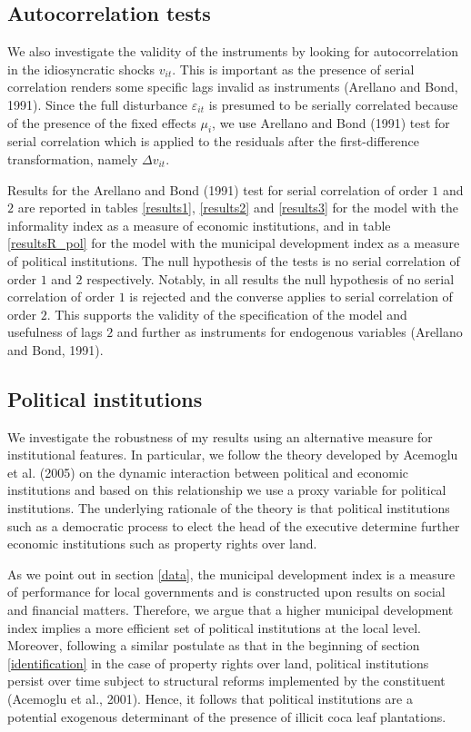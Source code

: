 \subsection{Autocorrelation tests}
\label{auto}

We also investigate the validity of the instruments by looking for  autocorrelation in the idiosyncratic shocks $v_{it}$. This is important as the presence of serial correlation renders some specific lags invalid as instruments (Arellano and Bond, 1991). Since the full disturbance $\varepsilon_{it}$ is presumed to be serially correlated because of the presence of the fixed effects $\mu_{i}$, we use Arellano and Bond (1991) test for serial correlation which is applied to the residuals after the first-difference transformation, namely $\Delta v_{it}$.

Results for the Arellano and Bond (1991) test for serial correlation of order $1$ and $2$ are reported in tables \ref{results1}, \ref{results2} and \ref{results3} for the model with the informality index as a measure of economic institutions, and in table \ref{resultsR_pol} for the model with the municipal development index as a measure of political institutions. The null hypothesis of the tests is no serial correlation of order $1$ and $2$ respectively. Notably, in all results the null hypothesis of no serial correlation of order $1$ is rejected and the converse applies to serial correlation of order $2$. This supports the validity of the specification of the model and usefulness of lags $2$ and further as instruments for endogenous variables (Arellano and Bond, 1991).

\subsection{Political institutions}

We investigate the robustness of my results using an alternative measure for institutional features. In particular, we follow the theory developed by Acemoglu et al. (2005) on the dynamic interaction between political and economic institutions and based on this relationship we use a proxy variable for political institutions. The underlying rationale of the theory is that political institutions such as a democratic process to elect the head of the executive determine further economic institutions such as property rights over land.

As we point out in section \ref{data}, the municipal development index is a measure of performance for local governments and is constructed upon results on social and financial matters. Therefore, we argue that a higher municipal development index implies a more efficient set of political institutions at the local level. Moreover, following a similar postulate as that in the beginning of section \ref{identification} in the case of property rights over land, political institutions persist over time subject to structural reforms implemented by the constituent (Acemoglu et al., 2001). Hence, it follows that political institutions are a potential exogenous determinant of the presence of illicit coca leaf plantations.

